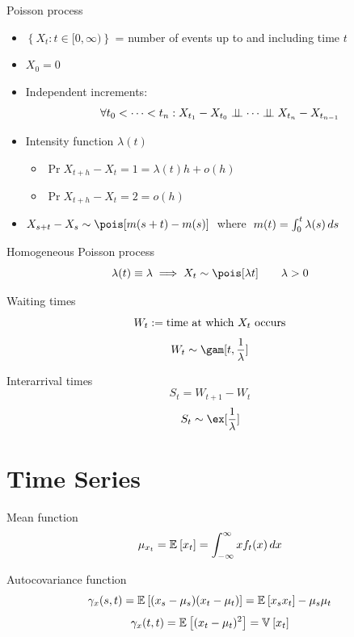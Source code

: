 \documentclass[landscape]{article}
\begin{document}
\begin{multicols*}{2}
Poisson process
\begin{itemize}
  \item $\left\{ X_t : t \in [0,\infty) \right\}$
    = number of events up to and including time $t$
  \item $X_0 = 0$
  \item Independent increments:
    \[\forall t_0 < \cdots < t_n:
    X_{t_1} - X_{t_0} \perp\!\!\!\perp \cdots \perp\!\!\!\perp X_{t_n} - X_{t_{n-1}}\]
  \item Intensity function $\lambda(t)$
    \begin{itemize}
      \item $\Pr{X_{t+h}-X_t = 1} = \lambda(t) h + o(h)$
      \item $\Pr{X_{t+h}-X_t = 2} = o(h)$
    \end{itemize}
  \item $X_{s+t} - X_s \dist \pois[m(s+t)-m(s)]\;$ where
    $\;m(t)=\int_0^t\lambda(s)\,ds$
\end{itemize}

Homogeneous Poisson process
\[\lambda(t) \equiv \lambda \imp X_t \dist \pois[\lambda t] \qquad \lambda > 0\]

Waiting times
\[W_t := \text{time at which $X_t$ occurs}\]
\[W_t \dist \gam[t, \frac{1}{\lambda}]\]

Interarrival times
\[S_t = W_{t+1} - W_t\]
\[S_t \dist \ex[\frac{1}{\lambda}]\]

\begin{center}
\end{center}

\section{Time Series}

Mean function
\[\mu_{x_t} = \mathbb{E}_{}\left[x_t\right] = \int_{-\infty}^\infty x f_t(x) \,dx\]

Autocovariance function
\[\gamma_x(s,t) = \mathbb{E}_{}\left[(x_s-\mu_s)(x_t-\mu_t)\right] = \mathbb{E}_{}\left[x_sx_t\right] - \mu_s\mu_t\]
\[\gamma_x(t,t) = \mathbb{E}_{}\left[(x_t-\mu_t)^2\right] = \mathbb{V}_{}\left[x_t\right]\]


\end{multicols*}
\end{document}
